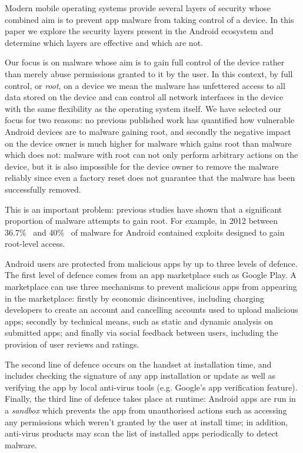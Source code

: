 \documentclass{llncs}
\begin{document}
Modern mobile operating systems provide several layers of security whose combined aim is to prevent app malware from taking control of a device. 
In this paper we explore the security layers present in the Android ecosystem and determine which layers are effective and which are not. 

Our focus is on malware whose aim is to gain full control of the device rather than merely abuse permissions granted to it by the user.
In this context, by full control, or \emph{root}, on a device we mean the malware has unfettered access to all data stored on the device and can control all network interfaces in the device with the same flexibility as the operating system itself.
We have selected our focus for two reasons: no previous published work has quantified how vulnerable Android devices are to malware gaining root, and secondly the negative impact on the device owner is much higher for malware which gains root than malware which does not: malware with root can not only perform arbitrary actions on the device, but it is also impossible for the device owner to remove the malware reliably since even a factory reset does not guarantee that the malware has been successfully removed. 

This is an important problem: previous studies have shown that a significant proportion of malware attempts to gain root.
For example, in 2012 between 36.7\%~\cite{Zhou2012b} and 40\%~\cite{Zhou2012a} of malware for Android contained exploits designed to gain root-level access.

Android users are protected from malicious apps by up to three levels of defence. 
The first level of defence comes from an app marketplace such as Google Play. 
A marketplace can use three mechanisms to prevent malicious apps from appearing in the marketplace: firstly by economic disincentives, including charging developers to create an account and cancelling accounts used to upload malicious apps; secondly by technical means, such as static and dynamic analysis on submitted apps; and finally via social feedback between users, including the provision of user reviews and ratings. 

The second line of defence occurs on the handset at installation time, and includes checking the signature of any app installation or update as well as verifying the app by local anti-virus tools (e.g. Google's app verification feature). 
Finally, the third line of defence takes place at runtime: Android apps are run in a \emph{sandbox} which prevents the app from unauthorised actions such as accessing any permissions which weren't granted by the user at install time; in addition, anti-virus products may scan the list of installed apps periodically to detect malware.
\end{document}
